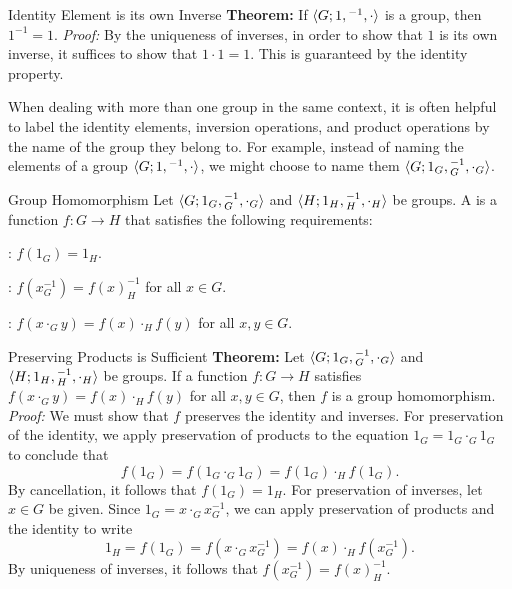 \begin{thmbox}{Identity Element is its own Inverse}
	\textbf{Theorem:} If ${\langle {G; 1, {}^{-1}, \cdot} \rangle}$ is a group, then $1^{-1} = 1$.
	\tcblower
	\textit{Proof:} By the uniqueness of inverses, in order to show that $1$ is its own inverse, it suffices to show that $1 \cdot 1 = 1$. This is guaranteed by the identity property.
\end{thmbox}

When dealing with more than one group in the same context, it is often helpful to label the identity elements, inversion operations, and product operations by the name of the group they belong to. For example, instead of naming the elements of a group ${\langle {G; 1, {}^{-1}, \cdot} \rangle}$, we might choose to name them ${\langle {G; 1_G, {}^{-1}_G, \cdot_G} \rangle}$.

\begin{dfnbox}{Group Homomorphism}
	Let ${\langle {G; 1_G, {}^{-1}_G, \cdot_G} \rangle}$ and ${\langle {H; 1_H, {}^{-1}_H, \cdot_H} \rangle}$ be groups. A  is a function $f: G \to H$ that satisfies the following requirements:
	\begin{dfnitems}
		\item {}: $f(1_G) = 1_H$.
		\item {}: $f(x^{-1}_G) = f(x)^{-1}_H$ for all $x \in G$.
		\item {}: $f(x \cdot_G y) = f(x) \cdot_H f(y)$ for all $x, y \in G$.
	\end{dfnitems}
\end{dfnbox}

\begin{thmbox}{Preserving Products is Sufficient}
	\textbf{Theorem:} Let ${\langle {G; 1_G, {}^{-1}_G, \cdot_G} \rangle}$ and ${\langle {H; 1_H, {}^{-1}_H, \cdot_H} \rangle}$ be groups. If a function $f: G \to H$ satisfies $f(x \cdot_G y) = f(x) \cdot_H f(y)$ for all $x, y \in G$, then $f$ is a group homomorphism.
	\tcblower
	\textit{Proof:} We must show that $f$ preserves the identity and inverses. For preservation of the identity, we apply preservation of products to the equation $1_G = 1_G \cdot_G 1_G$ to conclude that
	\[ f(1_G) = f(1_G \cdot_G 1_G) = f(1_G) \cdot_H f(1_G). \]
	By cancellation, it follows that $f(1_G) = 1_H$. For preservation of inverses, let $x \in G$ be given. Since $1_G = x \cdot_G x^{-1}_G$, we can apply preservation of products and the identity to write
	\[ 1_H = f(1_G) = f(x \cdot_G x^{-1}_G) = f(x) \cdot_H f(x^{-1}_G). \]
	By uniqueness of inverses, it follows that $f(x^{-1}_G) = f(x)^{-1}_H$.
\end{thmbox}

